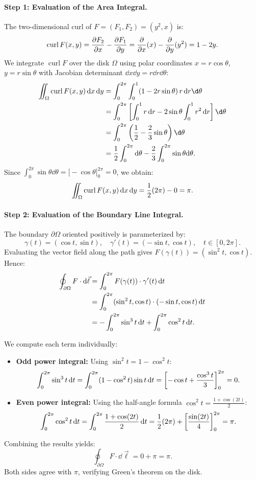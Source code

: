 \paragraph{Step 1: Evaluation of the Area Integral.}
The two-dimensional curl of \(F = (F_1, F_2) = (y^2, x)\) is:
\[
    \operatorname{curl} F(x, y) = \pdv{F_2}{x} - \pdv{F_1}{y} = \pdv{}{x}(x) - \pdv{}{y}(y^2) = 1 - 2y.
\]
We integrate \(\operatorname{curl} F\) over the disk \(\Omega\) using polar coordinates \(x = r\cos\theta\), \(y = r\sin\theta\) with Jacobian determinant \(\dd x \dd y = r \dd r \dd\theta\):
\begin{align*}
    \iint_{\Omega} \operatorname{curl} F(x, y) \dx\dy 
    &= \int_{0}^{2\pi} \int_{0}^{1} (1 - 2r\sin\theta) \, r \dr \d\theta \\
    &= \int_{0}^{2\pi} \left[ \int_{0}^{1} r \dr - 2\sin\theta \int_{0}^{1} r^2 \dr \right] \d\theta \\
    &= \int_{0}^{2\pi} \left( \frac{1}{2} - \frac{2}{3}\sin\theta \right) \d\theta \\
    &= \frac{1}{2} \int_{0}^{2\pi} \dd\theta - \frac{2}{3} \int_{0}^{2\pi} \sin\theta \dd\theta.
\end{align*}
Since \(\int_{0}^{2\pi} \sin\theta \dd\theta = \bigl[-\cos\theta\bigr]_{0}^{2\pi} = 0\), we obtain:
\[
    \iint_{\Omega} \operatorname{curl} F(x, y) \,\mathrm{d}x\,\mathrm{d}y = \frac{1}{2}(2\pi) - 0 = \pi.
\]

\paragraph{Step 2: Evaluation of the Boundary Line Integral.}
The boundary \(\partial\Omega\) oriented positively is parameterized by:
\[
    \gamma(t) = (\cos t, \sin t), \quad \gamma'(t) = (-\sin t, \cos t), \quad t \in [0, 2\pi].
\]
Evaluating the vector field along the path gives \(F(\gamma(t)) = (\sin^2 t, \cos t)\). Hence:
\begin{align*}
    \oint_{\partial\Omega} F \cdot \mathrm{d}\vec{\ell} 
    &= \int_{0}^{2\pi} F(\gamma(t)) \cdot \gamma'(t) \,\mathrm{d}t \\
    &= \int_{0}^{2\pi} (\sin^2 t, \cos t) \cdot (-\sin t, \cos t) \,\mathrm{d}t \\
    &= -\int_{0}^{2\pi} \sin^3 t \,\mathrm{d}t + \int_{0}^{2\pi} \cos^2 t \,\mathrm{d}t.
\end{align*}

We compute each term individually:
\begin{itemize}
    \item \textbf{Odd power integral:} Using \(\sin^2 t = 1 - \cos^2 t\):
    \[
        \int_{0}^{2\pi} \sin^3 t \,\mathrm{d}t = \int_{0}^{2\pi} (1 - \cos^2 t) \sin t \,\mathrm{d}t = \left[ -\cos t + \frac{\cos^3 t}{3} \right]_{0}^{2\pi} = 0.
    \]
    \item \textbf{Even power integral:} Using the half-angle formula \(\cos^2 t = \frac{1 + \cos(2t)}{2}\):
    \[
        \int_{0}^{2\pi} \cos^2 t \,\mathrm{d}t = \int_{0}^{2\pi} \frac{1 + \cos(2t)}{2} \,\mathrm{d}t = \frac{1}{2}(2\pi) + \left[ \frac{\sin(2t)}{4} \right]_{0}^{2\pi} = \pi.
    \]
\end{itemize}
Combining the results yields:
\[
    \oint_{\partial\Omega} F \cdot \dd\vec{\ell} = 0 + \pi = \pi.
\]
Both sides agree with \(\pi\), verifying Green's theorem on the disk.